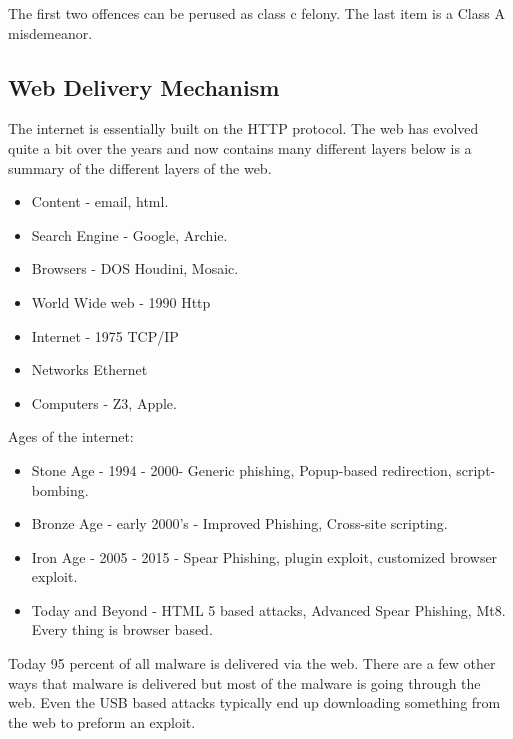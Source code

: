 \documentclass[letterpaper, onecolumn,10pt]{IEEEtran}
\begin{document}
		        The first two offences can be perused as class c felony. The last item is a Class A misdemeanor.\\
		        
		        \subsection{Web Delivery Mechanism}
		        The internet is essentially built on the HTTP protocol. The web has evolved quite a bit over the years and now contains many different layers below is a summary of the different layers of the web.
		        
		        \begin{itemize}
		            \item Content - email, html.
		            \item Search Engine - Google, Archie.
		            \item Browsers - DOS Houdini, Mosaic.
		            \item World Wide web - 1990 Http
		            \item Internet - 1975 TCP/IP
		            \item Networks Ethernet
		            \item Computers - Z3, Apple.
		        \end{itemize}
		         
		         Ages of the internet:
		        \begin{itemize}
		             \item Stone Age - 1994 - 2000- Generic phishing, Popup-based redirection, script-bombing.\\
		             \item Bronze Age - early 2000's - Improved Phishing, Cross-site scripting.\\
		             \item Iron Age - 2005 - 2015 - Spear Phishing, plugin exploit, customized browser exploit.\\
		             \item Today and Beyond - HTML 5 based attacks, Advanced Spear Phishing, Mt8. Every thing is browser based.
		        \end{itemize}
		        Today 95 percent of all malware is delivered via the web. There are a few other ways that malware is delivered but most of the malware is going through the web. Even the USB based attacks typically end up downloading something from the web to preform an exploit.\\
		        
\end{document}
